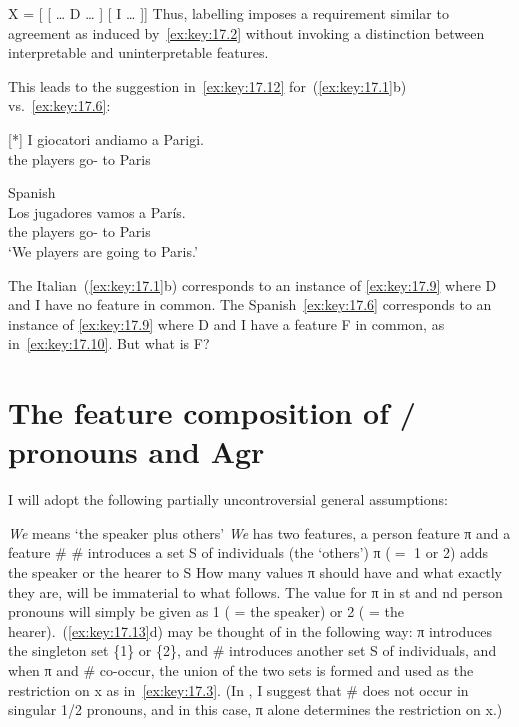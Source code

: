 \documentclass[output=paper]{langsci/langscibook}
\begin{document}
\ea\label{ex:key:17.11}
    X = [ [ \dots{} D \dots{} ] [ I \dots{} ]]
\z
Thus, labelling imposes a requirement similar to agreement as induced
by~\eqref{ex:key:17.2} without invoking a distinction between interpretable and
uninterpretable features.

This leads to the suggestion in~\eqref{ex:key:17.12} for~(\ref{ex:key:17.1}b) vs.\
\eqref{ex:key:17.6}:

\begin{exe}
    \exi{\eqref{ex:key:17.1}} 
    \begin{xlist}
    [*]{%
    \gll I giocatori andiamo a Parigi.\\
    the players go-\Fpl{} to Paris\\
    \glt}
    \end{xlist}
\end{exe}
\begin{exe}
\exi{\eqref{ex:key:17.6}} Spanish\\
    \gll    Los jugadores vamos a París.\\
            the players      go-\Fpl{} to Paris\\
    \glt    ‘We players are going to Paris.’\\
\end{exe}

\ea\label{ex:key:17.12}
    \ea The Italian~(\ref{ex:key:17.1}b) corresponds to an instance of
    \eqref{ex:key:17.9} where D and I have no feature in common.
    \ex The Spanish~\eqref{ex:key:17.6} corresponds to an instance of
    \eqref{ex:key:17.9} where D and I have a feature F in common, as
    in~\eqref{ex:key:17.10}.
    \z
\z
But what is F?

\section{The feature composition of \First/\Spl{} pronouns and
Agr}\label{sec:key:17.3}

I will adopt the following partially uncontroversial general assumptions:

\ea\label{ex:key:17.13}
    \ea \emph{We} means ‘the speaker plus others’
    \ex \emph{We} has two features, a person feature π and a feature \#
    \ex \# introduces a set S of individuals (the ‘others’)
    \ex π ($=$ 1 or 2) adds the speaker or the hearer to S
    \z
\z
How many values π should have and what exactly they are, will be immaterial
to what follows. The value for π in \First{}st and \Second{}nd person
pronouns will simply be given as 1 ( = the speaker) or 2 ( = the
hearer).~(\ref{ex:key:17.13}d) may be thought of in the following way: π
introduces the singleton set \{1\} or \{2\}, and \# introduces another set S of
individuals, and when π and \# co-occur, the union of the two sets is
formed and used as the restriction on x as in~\eqref{ex:key:17.3}. (In , I
suggest that \# does not occur in singular 1/2 pronouns, and in this case,
π alone determines the restriction on x.)
\end{document}
